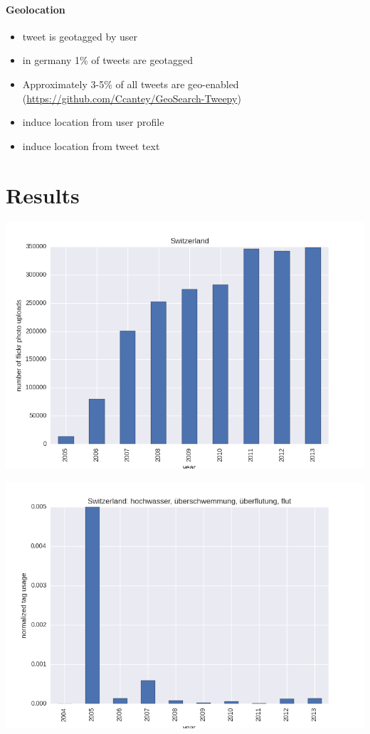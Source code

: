 \documentclass[letterpaper,10pt,english]{sphinxmanual}
\begin{document}
\subsubsection{Geolocation}
\label{twitter:geolocation}\begin{itemize}
\item {} 
tweet is geotagged by user

\item {} 
in germany 1\% of tweets are geotagged

\item {} 
Approximately 3-5\% of all tweets are geo-enabled (\href{https://github.com/Ccantey/GeoSearch-Tweepy}{https://github.com/Ccantey/GeoSearch-Tweepy})

\item {} 
induce location from user profile

\item {} 
induce location from tweet text

\end{itemize}


\chapter{Results}
\label{results::doc}\label{results:results}
\includegraphics{flickr_switzerland.png}

\includegraphics{flickr_flooding_switzerland.png}
\end{document}
